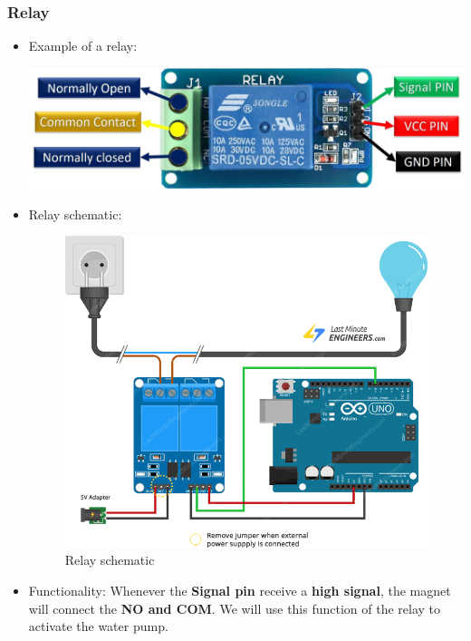 \documentclass[12pt]{article}
\begin{document}
        \subsubsection{Relay}
            \begin{itemize}
                \item Example of a relay:
                \begin{center}
                    \includegraphics[scale = 0.2]{./images/relay.jpg}
                \end{center}

                \item Relay schematic: 
                \begin{figure}[!h]
                    \centering
                    \includegraphics[scale = 3]{./images/relay_schematic.png}
                    \caption{Relay schematic}
                    \label{fig:relay schematic}
                \end{figure}

                \item Functionality: Whenever the \textbf{Signal pin} receive a \textbf{high signal}, the magnet will connect the \textbf{NO and COM}. We will use this function of the relay to activate the water pump.
            \end{itemize}
\end{document}
